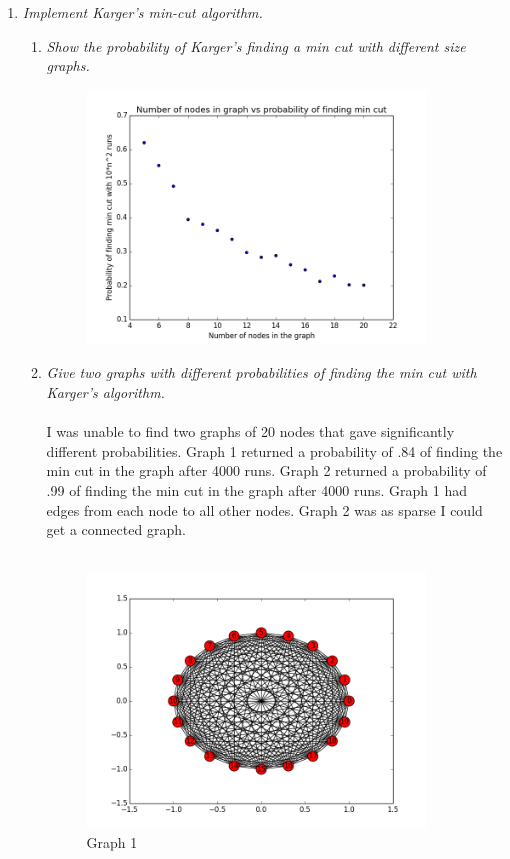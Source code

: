 \documentclass[12pt]{article}
\begin{document}
\begin{enumerate}
		\newpage
		\item \textit{Implement Karger's min-cut algorithm.}\\
    \begin{enumerate}
    \item \textit{Show the probability of Karger's finding a min cut with different size graphs.}\\
          \begin{figure}[H]
		      \centering
			    \includegraphics[width=9cm]{q3_5a.png}
			    \end{figure}
    \item \textit{Give two graphs with different probabilities of finding the min cut with Karger's algorithm.}\\
          \\
          I was unable to find two graphs of 20 nodes that gave significantly different probabilities.  
          Graph 1 returned a probability of .84 of finding the min cut in the graph after 4000 runs.
          Graph 2 returned a probability of .99 of finding the min cut in the graph after 4000 runs.
          Graph 1 had edges from each node to all other nodes.  Graph 2 was as sparse I could get a connected graph.\\
          \\
          \begin{figure}[H]
		      \centering
          \caption{Graph 1}
			    \includegraphics[width=9cm]{graph1_ps3_q5b.png}

\end{figure}
\end{enumerate}
\end{enumerate}
\end{document}
